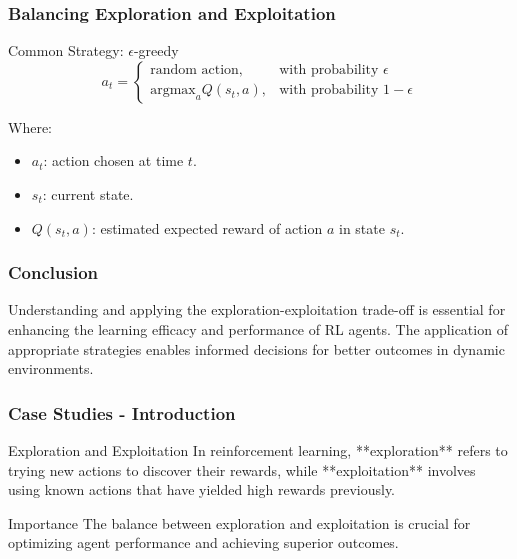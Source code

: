 \documentclass[aspectratio=169]{beamer}
\begin{document}
\begin{frame}[fragile]
    \frametitle{Balancing Exploration and Exploitation}
    \begin{block}{Common Strategy: $\epsilon$-greedy}
    \begin{equation}
    a_t = 
    \begin{cases}
    \text{random action}, & \text{with probability } \epsilon \\
    \text{argmax}_a Q(s_t, a), & \text{with probability } 1 - \epsilon
    \end{cases}
    \end{equation}
    \end{block}
    Where:
    \begin{itemize}
        \item $a_t$: action chosen at time $t$.
        \item $s_t$: current state.
        \item $Q(s_t, a)$: estimated expected reward of action $a$ in state $s_t$.
    \end{itemize}
\end{frame}

\begin{frame}[fragile]
    \frametitle{Conclusion}
    Understanding and applying the exploration-exploitation trade-off is essential for enhancing the learning efficacy and performance of RL agents. 
    The application of appropriate strategies enables informed decisions for better outcomes in dynamic environments.
\end{frame}

\begin{frame}[fragile]
    \frametitle{Case Studies - Introduction}
    \begin{block}{Exploration and Exploitation}
        In reinforcement learning, **exploration** refers to trying new actions to discover their rewards, while **exploitation** involves using known actions that have yielded high rewards previously. 
    \end{block}
    \begin{block}{Importance}
        The balance between exploration and exploitation is crucial for optimizing agent performance and achieving superior outcomes.
    \end{block}
\end{frame}
\end{document}
